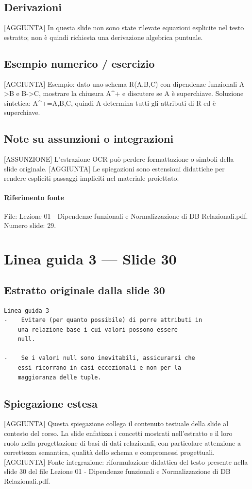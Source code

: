 \documentclass[11pt]{article}
\begin{document}
\subsection*{Derivazioni}
[AGGIUNTA] In questa slide non sono state rilevate equazioni esplicite nel testo estratto; non è quindi richiesta una derivazione algebrica puntuale.
\subsection*{Esempio numerico / esercizio}
[AGGIUNTA] Esempio: dato uno schema R(A,B,C) con dipendenze funzionali A->B e B->C, mostrare la chiusura A^+ e discutere se A è superchiave. Soluzione sintetica: A^+={A,B,C}, quindi A determina tutti gli attributi di R ed è superchiave.
\subsection*{Note su assunzioni o integrazioni}
[ASSUNZIONE] L'estrazione OCR può perdere formattazione o simboli della slide originale.
[AGGIUNTA] Le spiegazioni sono estensioni didattiche per rendere espliciti passaggi impliciti nel materiale proiettato.
\paragraph{Riferimento fonte} File: Lezione 01 - Dipendenze funzionali e Normalizzazione di DB Relazionali.pdf. Numero slide: 29.
\section{Linea guida 3 --- Slide 30}
\subsection*{Estratto originale dalla slide 30}
\begin{lstlisting}
Linea guida 3
-    Evitare (per quanto possibile) di porre attributi in
    una relazione base i cui valori possono essere
    null.

-    Se i valori null sono inevitabili, assicurarsi che
    essi ricorrano in casi eccezionali e non per la
    maggioranza delle tuple.
\end{lstlisting}
\subsection*{Spiegazione estesa}
[AGGIUNTA] Questa spiegazione collega il contenuto testuale della slide al contesto del corso. La slide enfatizza i concetti mostrati nell'estratto e il loro ruolo nella progettazione di basi di dati relazionali, con particolare attenzione a correttezza semantica, qualità dello schema e compromessi progettuali.
[AGGIUNTA] Fonte integrazione: riformulazione didattica del testo presente nella slide 30 del file Lezione 01 - Dipendenze funzionali e Normalizzazione di DB Relazionali.pdf.
\end{document}
